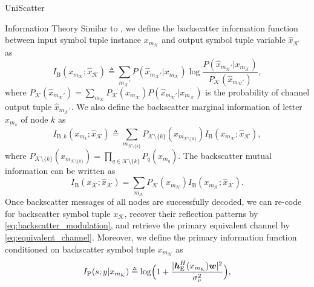 \documentclass[journal]{IEEEtran}
\begin{document}
\begin{section}{UniScatter}
\begin{subsection}{Information Theory}
		Similar to \cite{Rezaeian2004}, we define the backscatter information function between input symbol tuple instance $x_{m_{\mathcal{K}}}$ and output symbol tuple variable $\hat{x}_{\mathcal{K}}$ as
		\begin{equation}
			I_{\mathrm{B}}(x_{m_{\mathcal{K}}};\hat{x}_{\mathcal{K}}) \triangleq \sum_{m_{\mathcal{K}}'} P(\hat{x}_{m_{\mathcal{K}}'}|x_{m_{\mathcal{K}}}) \log \frac{P(\hat{x}_{m_{\mathcal{K}}'}|x_{m_{\mathcal{K}}})}{P_{\mathcal{K}}(\hat{x}_{m_{\mathcal{K}}'})},
			\label{eq:backscatter_information_function}
		\end{equation}
		where $P_{\mathcal{K}}(\hat{x}_{m_{\mathcal{K}}'}) = \sum_{m_{\mathcal{K}}} P_{\mathcal{K}}(x_{m_{\mathcal{K}}}) P(\hat{x}_{m_{\mathcal{K}}'}|x_{m_{\mathcal{K}}})$ is the probability of channel output tuple $\hat{x}_{m_{\mathcal{K}}'}$.
		We also define the backscatter marginal information of letter $x_{m_k}$ of node $k$ as
		\begin{equation}
			I_{\mathrm{B},k}(x_{m_k};\hat{x}_{\mathcal{K}}) \triangleq \sum_{m_{\mathcal{K} \setminus \{k\}}} P_{\mathcal{K} \setminus \{k\}}(x_{m_{\mathcal{K} \setminus \{k\}}}) I_{\mathrm{B}}(x_{m_{\mathcal{K}}};\hat{x}_{\mathcal{K}}),
			\label{eq:backscatter_marginal_information}
		\end{equation}
		where $P_{\mathcal{K} \setminus \{k\}}(x_{m_{\mathcal{K} \setminus \{k\}}}) = \prod_{q \in \mathcal{K} \setminus \{k\}} P_{q}(x_{m_{q}})$.
		The backscatter mutual information can be written as
		\begin{equation}
			I_{\mathrm{B}}(x_{\mathcal{K}};\hat{x}_{\mathcal{K}}) = \sum_{m_{\mathcal{K}}} P_{\mathcal{K}}(x_{m_{\mathcal{K}}}) I_{\mathrm{B}}(x_{m_{\mathcal{K}}};\hat{x}_{\mathcal{K}}).
			\label{eq:backscatter_mutual_information}
		\end{equation}
		Once backscatter messages of all nodes are successfully decoded, we can re-code for backscatter symbol tuple $x_{\mathcal{K}}$, recover their reflection patterns by \eqref{eq:backscatter_modulation}, and retrieve the primary equivalent channel by \eqref{eq:equivalent_channel}.
		Moreover, we define the primary information function conditioned on backscatter symbol tuple $x_{m_{\mathcal{K}}}$ as
		\begin{equation}
			I_{\mathrm{P}}(s;y|x_{m_{\mathcal{K}}}) \triangleq \log \Bigl(1 + \frac{\lvert \boldsymbol{h}_{\mathrm{E}}^H(x_{m_{\mathcal{K}}}) \boldsymbol{w} \rvert^2}{\sigma_v^2}\Bigr),
			\label{eq:primary_information_function}
		\end{equation}

\end{subsection}
\end{section}
\end{document}
